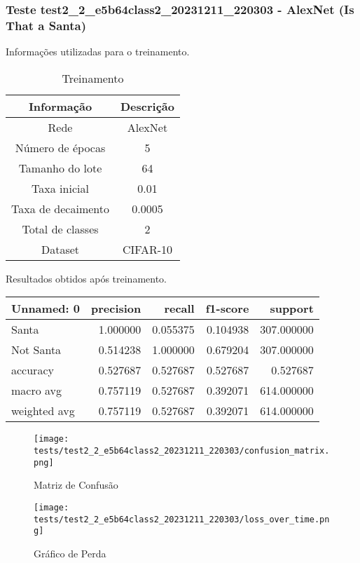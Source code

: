\subsubsection{Teste test2_2_e5b64class2_20231211_220303 - AlexNet (Is That a Santa)}

Informações utilizadas para o treinamento.

\begin{table}[ht]
   \centering
   \caption{Treinamento}
   \label{tab:modelos}
   \begin{tabular}{| c | c | }
      \hline 
      \textbf{Informação} & \textbf{Descrição} \\
      \hline \hline 
      Rede & AlexNet \\
      \hline
      Número de épocas & 5\\
      \hline
      Tamanho do lote & 64\\
      \hline
      Taxa inicial & 0.01 \\
      \hline
      Taxa de decaimento & 0.0005 \\
      \hline
      Total de classes & 2\\
      \hline
      Dataset & CIFAR-10\\
      \hline
   \end{tabular} 
\end{table}

Resultados obtidos após treinamento.

\begin{tabular}{lrrrr}
\toprule
  Unnamed: 0 &  precision &   recall &  f1-score &    support \\
\midrule
       Santa &   1.000000 & 0.055375 &  0.104938 & 307.000000 \\
   Not Santa &   0.514238 & 1.000000 &  0.679204 & 307.000000 \\
    accuracy &   0.527687 & 0.527687 &  0.527687 &   0.527687 \\
   macro avg &   0.757119 & 0.527687 &  0.392071 & 614.000000 \\
weighted avg &   0.757119 & 0.527687 &  0.392071 & 614.000000 \\
\bottomrule
\end{tabular}


\begin{figure}[ht]
 \begin{center}
   \texttt{[image: tests/test2\_2\_e5b64class2\_20231211\_220303/confusion\_matrix.png]}
  \caption{Matriz de Confusão}
  \label{fig:fig03}
 \end{center}
\end{figure}

\begin{figure}[ht]
 \begin{center}
   \texttt{[image: tests/test2\_2\_e5b64class2\_20231211\_220303/loss\_over\_time.png]}
  \caption{Gráfico de Perda}
  \label{fig:fig04}
 \end{center}
\end{figure}
